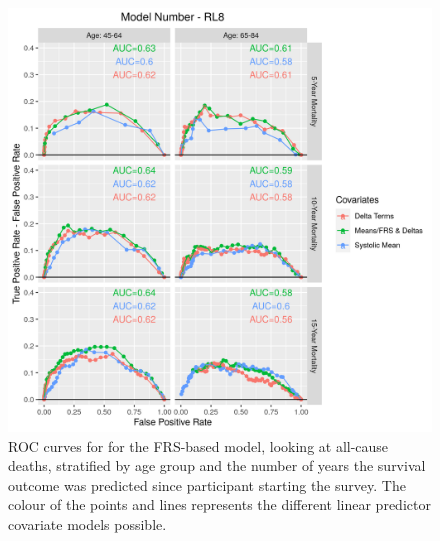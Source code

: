 \documentclass[
]{article}
\begin{document}
\begin{figure}
\centering
\includegraphics{./Rmarkdown_Plots/ROC_CAx-Covariates_EventType_RL8.png}
\caption{ROC curves for for the FRS-based model, looking at all-cause deaths, stratified by age group and the number of years the survival outcome was predicted since participant starting the survey. The colour of the points and lines represents the different linear predictor covariate models possible.}\label{fig:ROC_RL8}
\end{figure}
\end{document}
